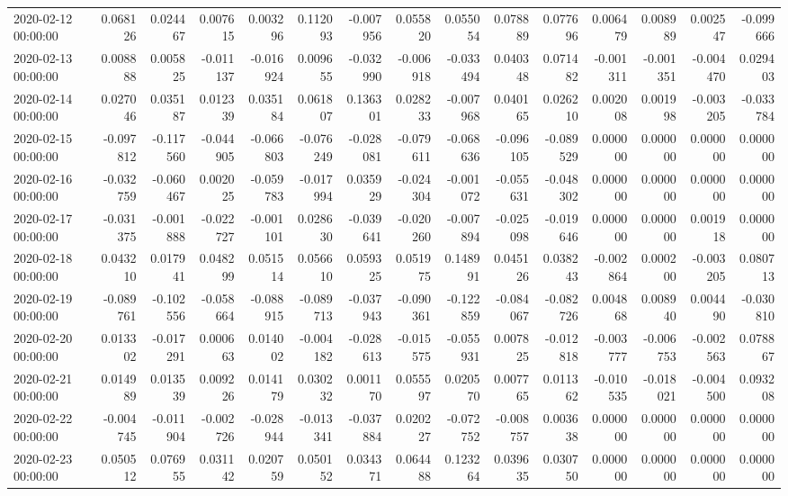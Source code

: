 \begin{tabular}{lrrrrrrrrrrrrrr}
2020-02-12 00:00:00 & 0.068126 & 0.024467 & 0.007615 & 0.003296 & 0.112093 & -0.007956 & 0.055820 & 0.055054 & 0.078889 & 0.077696 & 0.006479 & 0.008989 & 0.002547 & -0.099666 \\
2020-02-13 00:00:00 & 0.008888 & 0.005825 & -0.011137 & -0.016924 & 0.009655 & -0.032990 & -0.006918 & -0.033494 & 0.040348 & 0.071482 & -0.001311 & -0.001351 & -0.004470 & 0.029403 \\
2020-02-14 00:00:00 & 0.027046 & 0.035187 & 0.012339 & 0.035184 & 0.061807 & 0.136301 & 0.028233 & -0.007968 & 0.040165 & 0.026210 & 0.002008 & 0.001998 & -0.003205 & -0.033784 \\
2020-02-15 00:00:00 & -0.097812 & -0.117560 & -0.044905 & -0.066803 & -0.076249 & -0.028081 & -0.079611 & -0.068636 & -0.096105 & -0.089529 & 0.000000 & 0.000000 & 0.000000 & 0.000000 \\
2020-02-16 00:00:00 & -0.032759 & -0.060467 & 0.002025 & -0.059783 & -0.017994 & 0.035929 & -0.024304 & -0.001072 & -0.055631 & -0.048302 & 0.000000 & 0.000000 & 0.000000 & 0.000000 \\
2020-02-17 00:00:00 & -0.031375 & -0.001888 & -0.022727 & -0.001101 & 0.028630 & -0.039641 & -0.020260 & -0.007894 & -0.025098 & -0.019646 & 0.000000 & 0.000000 & 0.001918 & 0.000000 \\
2020-02-18 00:00:00 & 0.043210 & 0.017941 & 0.048299 & 0.051514 & 0.056610 & 0.059325 & 0.051975 & 0.148991 & 0.045126 & 0.038243 & -0.002864 & 0.000200 & -0.003205 & 0.080713 \\
2020-02-19 00:00:00 & -0.089761 & -0.102556 & -0.058664 & -0.088915 & -0.089713 & -0.037943 & -0.090361 & -0.122859 & -0.084067 & -0.082726 & 0.004868 & 0.008940 & 0.004490 & -0.030810 \\
2020-02-20 00:00:00 & 0.013302 & -0.017291 & 0.000663 & 0.014002 & -0.004182 & -0.028613 & -0.015575 & -0.055931 & 0.007825 & -0.012818 & -0.003777 & -0.006753 & -0.002563 & 0.078867 \\
2020-02-21 00:00:00 & 0.014989 & 0.013539 & 0.009226 & 0.014179 & 0.030232 & 0.001170 & 0.055597 & 0.020570 & 0.007765 & 0.011362 & -0.010535 & -0.018021 & -0.004500 & 0.093208 \\
2020-02-22 00:00:00 & -0.004745 & -0.011904 & -0.002726 & -0.028944 & -0.013341 & -0.037884 & 0.020227 & -0.072752 & -0.008757 & 0.003638 & 0.000000 & 0.000000 & 0.000000 & 0.000000 \\
2020-02-23 00:00:00 & 0.050512 & 0.076955 & 0.031142 & 0.020759 & 0.050152 & 0.034371 & 0.064488 & 0.123264 & 0.039635 & 0.030750 & 0.000000 & 0.000000 & 0.000000 & 0.000000 \\

\end{tabular}
